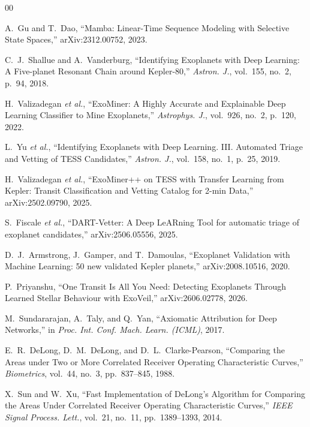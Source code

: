 \documentclass[conference]{IEEEtran}
\begin{document}
\begin{thebibliography}{00}

 A.~Gu and T.~Dao, ``Mamba: Linear-Time Sequence Modeling with
Selective State Spaces,'' arXiv:2312.00752, 2023.

 C.~J.~Shallue and A.~Vanderburg, ``Identifying Exoplanets with
Deep Learning: A Five-planet Resonant Chain around Kepler-80,'' \emph{Astron. J.},
vol.~155, no.~2, p.~94, 2018.

 H.~Valizadegan \emph{et al.}, ``ExoMiner: A Highly
Accurate and Explainable Deep Learning Classifier to Mine Exoplanets,''
\emph{Astrophys. J.}, vol.~926, no.~2, p.~120, 2022.

 L.~Yu \emph{et al.}, ``Identifying Exoplanets with Deep Learning.
III. Automated Triage and Vetting of TESS Candidates,'' \emph{Astron. J.},
vol.~158, no.~1, p.~25, 2019.

 H.~Valizadegan \emph{et al.}, ``ExoMiner++ on TESS with
Transfer Learning from Kepler: Transit Classification and Vetting Catalog for
2-min Data,'' arXiv:2502.09790, 2025.

 S.~Fiscale \emph{et al.}, ``DART-Vetter: A Deep LeARning Tool
for automatic triage of exoplanet candidates,'' arXiv:2506.05556, 2025.

 D.~J.~Armstrong, J.~Gamper, and T.~Damoulas, ``Exoplanet
Validation with Machine Learning: 50 new validated Kepler planets,''
arXiv:2008.10516, 2020.

 P.~Priyanshu, ``One Transit Is All You Need: Detecting
Exoplanets Through Learned Stellar Behaviour with ExoVeil,'' arXiv:2606.02778,
2026.

 M.~Sundararajan, A.~Taly, and Q.~Yan, ``Axiomatic
Attribution for Deep Networks,'' in \emph{Proc. Int. Conf. Mach. Learn. (ICML)},
2017.

 E.~R.~DeLong, D.~M.~DeLong, and D.~L.~Clarke-Pearson,
``Comparing the Areas under Two or More Correlated Receiver Operating
Characteristic Curves,'' \emph{Biometrics}, vol.~44, no.~3, pp.~837--845, 1988.

 X.~Sun and W.~Xu, ``Fast Implementation of DeLong's Algorithm for
Comparing the Areas Under Correlated Receiver Operating Characteristic Curves,''
\emph{IEEE Signal Process. Lett.}, vol.~21, no.~11, pp.~1389--1393, 2014.


\end{thebibliography}
\end{document}
